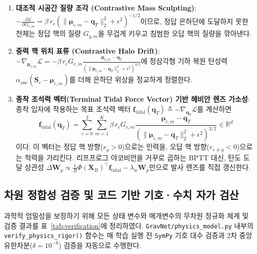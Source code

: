 \documentclass[11pt,a4paper]{article}
\begin{document}
\begin{enumerate}[leftmargin=18pt, itemsep=3pt]
  \item \textbf{대조적 시공간 질량 조각 (Contrastive Mass Sculpting)}:
  $-\frac{\partial \mathcal{L}}{\partial G_{c,m}} = \beta \, r_c \left(\|\boldsymbol{\mu}_{c,m} - \mathbf{q}_T\|_2^2 + \epsilon^2\right)^{-1/2}$이므로, 정답 은하단에 도달하지 못한 천체는 정답 핵의 질량 $G_{y,m}$을 무겁게 키우고 침범한 오답 핵의 질량을 깎아낸다.
  \item \textbf{중력 핵 위치 표류 (Contrastive Halo Drift)}:
  $-\nabla_{\boldsymbol{\mu}_{c,m}}\mathcal{L} = -\beta \, r_c G_{c,m} \frac{\boldsymbol{\mu}_{c,m} - \mathbf{q}_T}{(\|\boldsymbol{\mu}_{c,m} - \mathbf{q}_T\|_2^2 + \epsilon^2)^{3/2}}$에 정삼각형 기하 복원 탄성력 $\alpha_{\text{anc}}(\mathbf{S}_c - \boldsymbol{\mu}_{c,m})$를 더해 은하단 위상을 정교하게 정렬한다.
  \item \textbf{종착 조석력 벡터(Terminal Tidal Force Vector) 기반 헤비안 렌즈 가소성}:
  종착 입자에 작용하는 목표 조석력 벡터 $\mathbf{f}_{\text{tidal}}(\mathbf{q}_T) \triangleq -\nabla_{\mathbf{q}_T}\mathcal{L}$를 계산하면
  \begin{equation}
    \mathbf{f}_{\text{tidal}}(\mathbf{q}_T) = \sum_{c=0}^{2}\sum_{m=1}^{K} \beta \, r_c G_{c,m} \frac{\boldsymbol{\mu}_{c,m} - \mathbf{q}_T}{\left(\|\boldsymbol{\mu}_{c,m} - \mathbf{q}_T\|_2^2 + \epsilon^2\right)^{3/2}} \in \mathbb{R}^d
  \end{equation}
  이다. 이 벡터는 정답 핵 방향($r_y > 0$)으로는 인력을, 오답 핵 방향($r_{c\neq y} < 0$)으로는 척력을 가리킨다. 리프프로그 야코비안을 거꾸로 곱하는 BPTT 대신, 탄도 도달 상관성 $\Delta \mathbf{W}_p \propto \frac{1}{B}\Phi(\mathbf{X}_B)^\top \mathbf{f}_{\text{tidal}} - \lambda_w \mathbf{W}_p$만으로 발사 렌즈를 직접 갱신한다.
\end{enumerate}

\subsection{차원 정합성 검증 및 코드 기반 기호·수치 자가 검산}

과학적 엄밀성을 보장하기 위해 모든 상태 변수와 매개변수의 무차원 정규화 체계 및 검증 결과를 표~\ref{tab:verification}에 정리하였다. \texttt{GravNet/physics\_model.py} 내부의 \texttt{verify\_physics\_rigor()} 함수는 매 학습 실행 전 \texttt{SymPy} 기호 대수 검증과 2차 중앙 유한차분($\delta = 10^{-6}$) 검증을 자동으로 수행한다.
\end{document}
